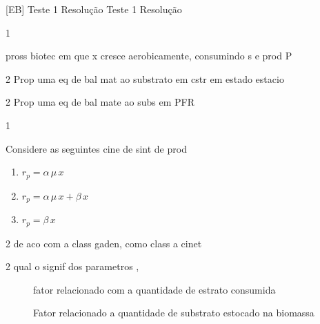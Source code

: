\documentclass[\mainfilename]{subfiles}
\begin{document}

[EB]
{Teste 1 Resolução} %
{Teste 1 Resolução} %

\begin{questionBox}1{ %
    pross biotec em que x cresce aerobicamente, consumindo s e prod P
    \begin{center}\large{}
    \end{center}
} %
    \begin{questionBox}2{ %
        Prop uma eq de bal mat ao substrato em cstr em estado estacio
    } %
    \end{questionBox}
    \begin{questionBox}2{ %
        Prop uma eq de bal mate ao subs em PFR
    } %
    \end{questionBox}
\end{questionBox}

\begin{questionBox}1{ %
    Considere as seguintes cine de sint de prod
    \begin{enumerate}[label={Caso \arabic{enumi}: },left=0px]
        \item \(r_p=\alpha\,\mu\,x\)
        \item \(r_p=\alpha\,\mu\,x+\beta\,x\)
        \item \(r_p=\beta\,x\)
    \end{enumerate}
} %
    \begin{questionBox}2{ %
        de aco com a class gaden, como class a cinet
    } %
    \end{questionBox}

    \begin{questionBox}2{ %
        qual o signif dos parametros \chemalpha, \chembeta
    } %
        \answer{}
        \begin{description}
            \item[\chemalpha] fator relacionado com a quantidade de estrato consumida
            \item[\chembeta] Fator relacionado a quantidade de substrato estocado na biomassa
        \end{description}
    \end{questionBox}
\end{questionBox}
\end{document}
